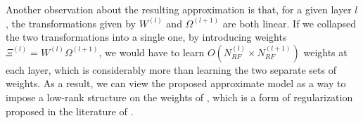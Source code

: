 



Another observation about the resulting \dgp approximation is that, for a given layer $l$, the transformations given by $W^{(l)}$ and $\Omega^{(l+1)}$ are both linear. %
If we collapsed the two transformations into a single one, by introducing weights $\Xi^{(l)} = W^{(l)} \Omega^{(l+1)}$, we would have to learn $O\left(N^{(l)}_{RF} \times N^{(l+1)}_{RF}\right)$ weights at each layer, which is considerably more than learning the two separate sets of weights.
As a result, we can view the proposed approximate \dgp model as a way to impose a low-rank structure on the weights of , which is a form of regularization proposed in the literature of  \citep{Novikov15,Sainath13,Denil13}.

